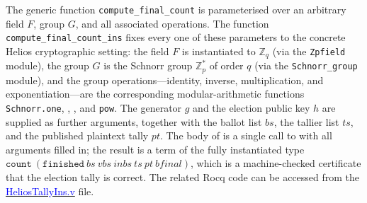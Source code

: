 \documentclass[sigconf, anonymous]{acmart}
\begin{document}
The generic function \texttt{compute\_final\_count} is parameterised over an
arbitrary field $F$, group $G$, and all associated operations.
The function \texttt{compute\_final\_count\_ins} fixes every one of these
parameters to the concrete Helios cryptographic setting: the field $F$ is
instantiated to $\mathbb{Z}_q$ (via the \texttt{Zpfield} module), the group
$G$ is the Schnorr group $\mathbb{Z}^*_p$ of order $q$ (via the
\texttt{Schnorr\_group} module), and the group operations---identity,
inverse, multiplication, and exponentiation---are the corresponding
modular-arithmetic functions \texttt{Schnorr.one}, \texttt{},
\texttt{}, and \texttt{pow}.
The generator $g$ and the election public key $h$
are supplied as further arguments, together with the ballot list $\mathit{bs}$,
the tallier list $\mathit{ts}$, and the published plaintext tally
$\mathit{pt}$.
The body of \texttt{} is a single call to
\texttt{} with all arguments filled in; the result is a
term of the fully instantiated type
$\texttt{count}~(\texttt{finished}~\mathit{bs}~\mathit{vbs}~\mathit{inbs}~\mathit{ts}~\mathit{pt}~\mathit{bfinal})$,
which is a machine-checked certificate that the election tally is correct. The related Rocq code can be accessed from  the 
\href{https://anonymous.4open.science/r/SigmaProtocol-EBA5/src/Examples/HeliosTallyIns.v}{\textcolor{blue}{HeliosTallyIns.v}} file.
\end{document}
